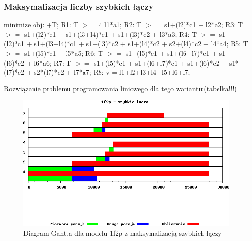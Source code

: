 \documentclass[a4paper,11pt, titlepage]{article}
\begin{document}
\subsubsection{Maksymalizacja liczby szybkich łączy}
\begin{flushleft}

minimize obj: +T;\linebreak
\linebreak
R1: T $>=4$ l1*a1;\linebreak
R2: T $>=$ s1+(l2)*c1 + l2*a2;\linebreak
R3: T $>=$ s1+(l2)*c1 + s1+(l3+l4)*c1 + s1+(l3)*c2 + l3*a3;\linebreak
R4: T $>=$ s1+(l2)*c1 + s1+(l3+l4)*c1 + s1+(l3)*c2 + s1+(l4)*c2 + s2+(l4)*c2 + l4*a4;\linebreak
R5: T $>=$ s1+(l5)*c1 + l5*a5;\linebreak
R6: T $>=$ s1+(l5)*c1 + s1+(l6+l7)*c1 + s1+(l6)*c2 + l6*a6;\linebreak
R7: T $>=$ s1+(l5)*c1 + s1+(l6+l7)*c1 + s1+(l6)*c2 + s1*(l7)*c2 + s2*(l7)*c2 + l7*a7;\linebreak
R8: v = l1+l2+l3+l4+l5+l6+l7;\linebreak
\end{flushleft}

Rozwiązanie problemu programowania liniowego dla tego wariantu:(tabelka!!!)
\begin{figure}[htp!]
\includegraphics[width=1.0\textwidth]{wykresy/2p1f_lacza}
\caption{Diagram Gantta dla modelu 1f2p z maksymalizacją szybkich łączy \label{2p1f_l}}
\end{figure}
\end{document}
